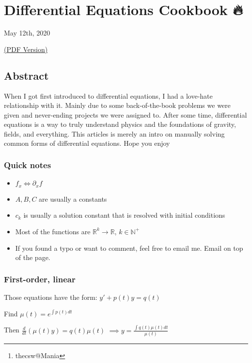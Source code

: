 \documentclass[12pt]{article}
\author{Sandy Urazayev\thanks{thecsw@Mania}}
\date{\today}
\title{}
\begin{document}
\section*{Differential Equations Cookbook 🔥}
\label{sec:org5d8e5e4}

May 12th, 2020

\href{./index.pdf}{(PDF Version)}

\subsection*{Abstract}
\label{sec:org87adafe}

When I got first introduced to differential equations, I had a love-hate
relationship with it. Mainly due to some back-of-the-book problems we were given
and never-ending projects we were assigned to. After some time, differential
equations is a way to truly understand physics and the foundations of gravity,
fields, and everything. This articles is merely an intro on manually solving
common forms of differential equations. Hope you enjoy

\subsubsection*{Quick notes}
\label{sec:orgcc80e56}

\begin{itemize}
\item \(f_x \iff \partial_x f\)
\item \(A,B,C\) are usually a constants
\item \(c_k\) is usually a solution constant that is resolved with initial conditions
\item Most of the functions are \(\mathbb{R}^k \to \mathbb{R}\), \(k \in \mathbb{N}^+\)
\item If you found a typo or want to comment, feel free to email me. Email on
top of the page.
\end{itemize}


\subsubsection*{First-order, linear}
\label{sec:orgd923f20}

Those equations have the form: \(y' + p(t) y = q(t)\)

Find \(\mu(t) = e^{\int p(t) dt}\)

Then \(\frac{d}{dt}(\mu(t)y) = q(t) \mu(t)\)
\(\implies y = \frac{\int q(t) \mu(t) dt}{\mu(t)}\)
\end{document}

